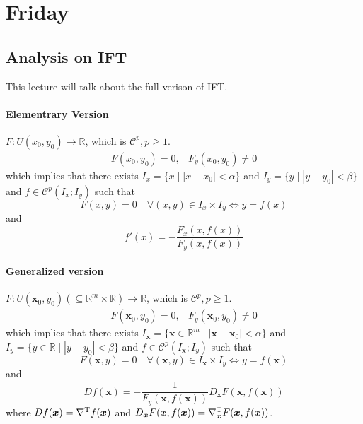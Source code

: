 
\section{Friday}
\subsection{Analysis on IFT}
This lecture will talk about the full verison of IFT.
\paragraph{Elementrary Version}$F: U(x_0,y_0)\to\mathbb{R}$, which is $\mathcal{C}^p, p\ge1$.
\[
\begin{array}{ll}
F(x_0,y_0)=0,
&
F_y(x_0,y_0)\ne0
\end{array}
\]
which implies that there exists $I_x=\{x\mid |x-x_0|<\alpha\}$ and $I_y=\{y\mid |y-y_0|<\beta\}$ and $f\in\mathcal{C}^p(I_x;I_y)$ such that
\[
F(x,y)=0\quad\forall (x,y)\in I_x\times I_y\Longleftrightarrow
y = f(x)
\]
and
\[
f'(x)=-\frac{F_x(x,f(x))}{F_y(x,f(x))}
\]


\paragraph{Generalized version}
$F: U(\bm x_0,y_0)(\subseteq\mathbb{R}^m\times\mathbb{R})\to\mathbb{R}$, which is $\mathcal{C}^p,p\ge1$.
\[
\begin{array}{ll}
F(\bm x_0,y_0)=0,
&
F_y(\bm x_0,y_0)\ne0
\end{array}
\]
which implies that there exists $I_{\bm x}=\{\bm x\in\mathbb{R}^m\mid |\bm x-\bm x_0|<\alpha\}$ and $I_y=\{y\in\mathbb{R}\mid |y-y_0|<\beta\}$ and $f\in\mathcal{C}^p(I_{\bm x};I_y)$ such that
\[
F(\bm x,y)=0\quad\forall (\bm x,y)\in I_{\bm x}\times I_y\Longleftrightarrow
y = f(\bm x)
\]
and
\[
Df(\bm x)=-\frac{1}{F_y(\bm x,f(\bm x))}D_{\bm x}F(\bm x,f(\bm x))
\]
where $Df(\bm x)=\nabla^{\mathrm T} f(\bm x)$ and $D_{\bm x}F(\bm x,f(\bm x))=\nabla_{\bm x}^{\mathrm T} F(\bm x,f(\bm x))$.

